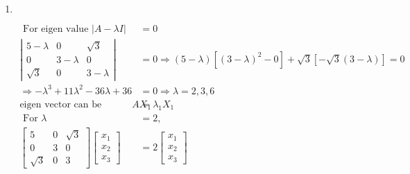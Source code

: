 \begin{enumerate}
\begin{answer}
\begin{align*}
\begin{array}{l}
		x_{1} \\
		x_{2} \\
		x_{3}
		\end{array}\right]=2\left[\begin{array}{l}
		x_{1} \\
		x_{2} \\
		x_{3}
		\end{array}\right] \Rightarrow x_{1}+x_{2}=2 x_{1}, x_{3}&=0 \Rightarrow x_{1}=x_{2} \Rightarrow X_{3}=\left[\begin{array}{c}
		x_{2} \\
		x_{2} \\
		0
		\end{array}\right]\\
		\text{From orthogonality condition }X_{3}{ }^{T} X_{3}&=1 \Rightarrow x_{2}=\frac{1}{\sqrt{2}} \Rightarrow X_{3}=\frac{1}{\sqrt{2}}\left[\begin{array}{l}1 \\ 1 \\ 0\end{array}\right]
		\end{align*}
			So the correct answers are \textbf{Option (a),(b),(c)and (d)}
	\end{answer}
	\item $\left. \right. $	
	\begin{answer}
		\begin{align*}
	\text{	For eigen value }|A-\lambda I|&=0\\
	\left|\begin{array}{ccc}5-\lambda & 0 & \sqrt{3} \\ 0 & 3-\lambda & 0 \\ \sqrt{3} & 0 & 3-\lambda\end{array}\right|&=0 \Rightarrow(5-\lambda)\left[(3-\lambda)^{2}-0\right]+\sqrt{3}[-\sqrt{3}(3-\lambda)]=0\\
	\Rightarrow-\lambda^{3}+11 \lambda^{2}-36 \lambda+36&=0 \Rightarrow \lambda=2,3,6\\
	\text{eigen vector can be determine by }A X_{1}&=\lambda_{1} X_{1}\\
	\text{	For }\lambda&=2,\\
	\left[\begin{array}{ccc}5 & 0 & \sqrt{3} \\ 0 & 3 & 0 \\ \sqrt{3} & 0 & 3\end{array}\right]\left[\begin{array}{l}x_{1} \\ x_{2} \\ x_{3}\end{array}\right]&=2\left[\begin{array}{l}x_{1} \\ x_{2} \\ x_{3}\end{array}\right]\\

\end{align*}
\end{answer}
\end{enumerate}
